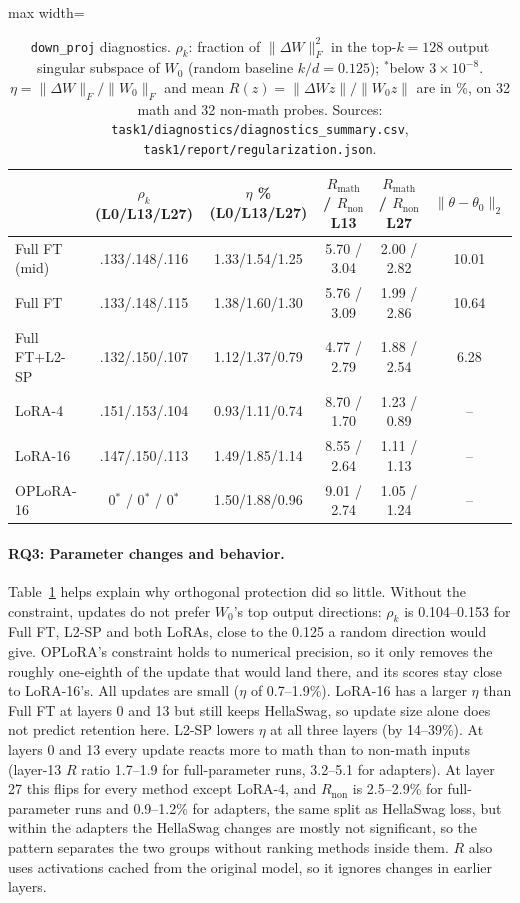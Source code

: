 \documentclass{article}
\begin{document}
\begin{table}[t]\centering\footnotesize\setlength{\tabcolsep}{4pt}
\begin{adjustbox}{max width=\linewidth}\begin{tabular}{lccccc}\toprule
 & $\rho_k$ (L0/L13/L27) & $\eta$ \% (L0/L13/L27) & $R_\text{math}$ / $R_\text{non}$ L13 & $R_\text{math}$ / $R_\text{non}$ L27 & $\|\theta-\theta_0\|_2$ \\\midrule
Full FT (mid) & .133/.148/.116 & 1.33/1.54/1.25 & 5.70 / 3.04 & 2.00 / 2.82 & 10.01 \\
Full FT       & .133/.148/.115 & 1.38/1.60/1.30 & 5.76 / 3.09 & 1.99 / 2.86 & 10.64 \\
Full FT+L2-SP & .132/.150/.107 & 1.12/1.37/0.79 & 4.77 / 2.79 & 1.88 / 2.54 & 6.28 \\
LoRA-4        & .151/.153/.104 & 0.93/1.11/0.74 & 8.70 / 1.70 & 1.23 / 0.89 & -- \\
LoRA-16       & .147/.150/.113 & 1.49/1.85/1.14 & 8.55 / 2.64 & 1.11 / 1.13 & -- \\
OPLoRA-16     & 0$^{*}$ / 0$^{*}$ / 0$^{*}$ & 1.50/1.88/0.96 & 9.01 / 2.74 & 1.05 / 1.24 & -- \\\bottomrule
\end{tabular}\end{adjustbox}
\caption{\texttt{down\_proj} diagnostics. $\rho_k$: fraction of $\|\Delta W\|_F^2$ in the top-$k{=}128$ output singular subspace of $W_0$ (random baseline $k/d=0.125$); $^{*}$below $3\times10^{-8}$. $\eta=\|\Delta W\|_F/\|W_0\|_F$ and mean $R(z)=\|\Delta W z\|/\|W_0z\|$ are in \%, on 32 math and 32 non-math probes. Sources: \texttt{task1/diagnostics/diagnostics\_summary.csv}, \texttt{task1/report/regularization.json}.}\label{tab:t1diag}
\end{table}

\paragraph{RQ3: Parameter changes and behavior.} Table~\ref{tab:t1diag} helps explain why orthogonal protection did so little. Without the constraint, updates do not prefer $W_0$'s top output directions: $\rho_k$ is 0.104--0.153 for Full FT, L2-SP and both LoRAs, close to the 0.125 a random direction would give. OPLoRA's constraint holds to numerical precision, so it only removes the roughly one-eighth of the update that would land there, and its scores stay close to LoRA-16's. All updates are small ($\eta$ of 0.7--1.9\%). LoRA-16 has a larger $\eta$ than Full FT at layers 0 and 13 but still keeps HellaSwag, so update size alone does not predict retention here. L2-SP lowers $\eta$ at all three layers (by 14--39\%). At layers 0 and 13 every update reacts more to math than to non-math inputs (layer-13 $R$ ratio 1.7--1.9 for full-parameter runs, 3.2--5.1 for adapters). At layer 27 this flips for every method except LoRA-4, and $R_\text{non}$ is 2.5--2.9\% for full-parameter runs and 0.9--1.2\% for adapters, the same split as HellaSwag loss, but within the adapters the HellaSwag changes are mostly not significant, so the pattern separates the two groups without ranking methods inside them. $R$ also uses activations cached from the original model, so it ignores changes in earlier layers.
\end{document}
